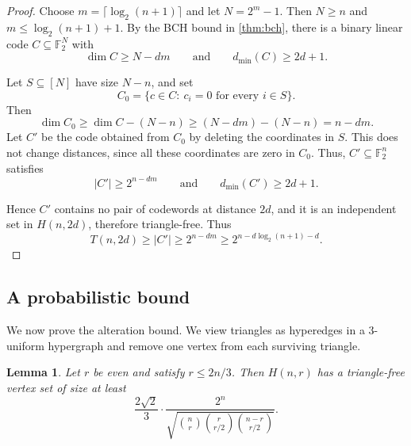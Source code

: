 \documentclass[11pt]{article}
\theoremstyle{plain}
\newtheorem{lemma}{Lemma}
\newcommand{\F}{\mathbb{F}}
\begin{document}
\begin{proof}
Choose $m=\lceil \log_2(n+1)\rceil$ and let $N=2^m-1$.
Then $N\ge n$ and $m\le \log_2(n+1)+1$.
By the BCH bound in \cref{thm:bch}, there is a binary linear code
$C\subseteq\F_2^N$ with
\[
\dim C\ge N-dm
\qquad\text{and}\qquad
d_{\min}(C)\ge 2d+1.
\]

Let $S\subseteq [N]$ have size $N-n$, and set
\[
C_0=\{c\in C:\ c_i=0 \text{ for every } i\in S\}.
\]
Then
\[
\dim C_0\ge \dim C-(N-n)\ge (N-dm)-(N-n)=n-dm.
\]
Let $C'$ be the code obtained from $C_0$ by deleting the coordinates in $S$. 
This does not change distances, since all these coordinates are zero in $C_0$. 
Thus, $C'\subseteq \F_2^n$ satisfies 
\[
|C'|\ge 2^{n-dm}
\qquad\text{and}\qquad
d_{\min}(C')\ge 2d+1.
\]

Hence $C'$ contains no pair of codewords at distance $2d$, and it is an independent set in $H(n,2d)$, therefore triangle-free.
Thus
\[
T(n,2d)\ge |C'|
\ge 2^{n-dm}
\ge 2^{n-d\log_2(n+1)-d}.
\]
\end{proof}

\subsection{A probabilistic bound}

We now prove the alteration bound.
We view triangles as hyperedges in a $3$-uniform hypergraph and remove one vertex from each surviving triangle.

\begin{lemma}\label{lem:alteration}
Let $r$ be even and satisfy $r\le 2n/3$.
Then $H(n,r)$ has a triangle-free vertex set of size at least
\[
\frac{2\sqrt{2}}{3}\cdot
\frac{2^n}{\sqrt{\binom{n}{r}\binom{r}{r/2}\binom{n-r}{r/2}}}.
\]
\end{lemma}
\end{document}
